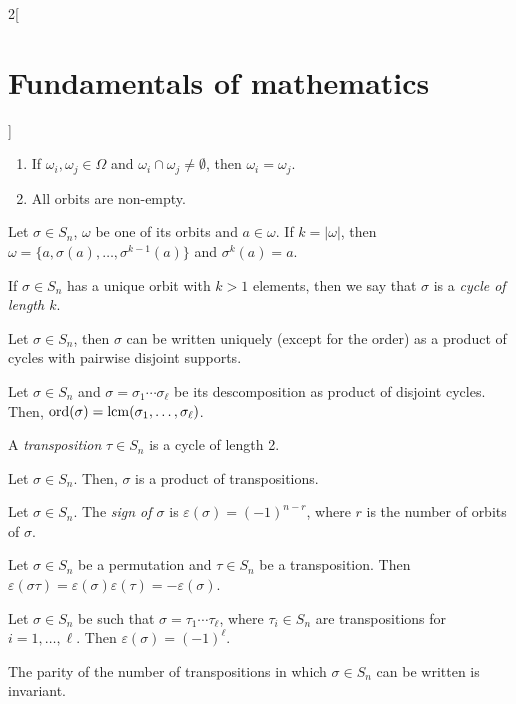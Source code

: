 \documentclass[../../../main.tex]{subfiles}
\begin{document}
\begin{multicols}{2}[\section{Fundamentals of mathematics}]
\begin{theorem}
\begin{enumerate}
            \item If $\omega_i,\omega_j\in\Omega$ and $\omega_i\cap\omega_j\ne\emptyset$, then $\omega_i=\omega_j$.
            \item All orbits are non-empty.
        \end{enumerate}
    \end{theorem}
    \begin{theorem}
        Let $\sigma\in S_n$, $\omega$ be one of its orbits and $a\in\omega$. If $k=|\omega|$, then $\omega=\{a,\sigma(a),\ldots,\sigma^{k-1}(a)\}$ and $\sigma^k(a)=a$.
    \end{theorem}
    \begin{definition}
        If $\sigma\in S_n$ has a unique orbit with $k>1$ elements, then we say that $\sigma$ is a \textit{cycle of length $k$}. 
    \end{definition}
    \begin{theorem}
        Let $\sigma\in S_n$, then $\sigma$ can be written uniquely (except for the order) as a product of cycles with pairwise disjoint supports.
    \end{theorem}
    \begin{corollary}
        Let $\sigma\in S_n$ and $\sigma=\sigma_1\cdots\sigma_\ell$ be its descomposition as product of disjoint cycles. Then, $\text{ord}(\sigma)=\operatorname{lcm}(\sigma_1,\ldots,\sigma_\ell)$.
    \end{corollary}
    \begin{definition}
        A \textit{transposition} $\tau\in S_n$ is a cycle of length 2.
    \end{definition}
    \begin{corollary}
        Let $\sigma\in S_n$. Then, $\sigma$ is a product of transpositions.
    \end{corollary}
    \begin{definition}
        Let $\sigma\in S_n$. The \textit{sign of $\sigma$} is $\varepsilon(\sigma)=(-1)^{n-r}$, where $r$ is the number of orbits of $\sigma$.
    \end{definition}
    \begin{theorem}
        Let $\sigma\in S_n$ be a permutation and $\tau\in S_n$ be a transposition. Then $\varepsilon(\sigma\tau)=\varepsilon(\sigma)\varepsilon(\tau)=-\varepsilon(\sigma)$.
    \end{theorem}
    \begin{corollary}
        Let $\sigma\in S_n$ be such that $\sigma=\tau_1\cdots\tau_\ell$, where $\tau_i\in S_n$ are transpositions for $i=1,\ldots,\ell$. Then $\varepsilon(\sigma)=(-1)^\ell$.
    \end{corollary}
    \begin{corollary}
        The parity of the number of transpositions in which $\sigma\in S_n$ can be written is invariant.
    \end{corollary}

\end{multicols}
\end{document}

